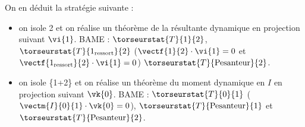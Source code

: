 On en déduit la stratégie suivante : 
\begin{itemize}
\item on isole 2 et on réalise un théorème de la résultante dynamique en projection suivant $\vi{1}$. BAME : 
$\torseurstat{T}{1}{2}$, $\torseurstat{T}{1_{\text{ressort}}}{2}$ ($\vectf{1}{2}\cdot \vi{1}= 0$ et 
$\vectf{1_{\text{ressort}}}{2}\cdot \vi{1}= 0$)
$\torseurstat{T}{\text{Pesanteur}}{2}$.
\item on isole \{1+2\} et on réalise un théorème du moment dynamique en $I$ en projection suivant $\vk{0}$. BAME : 
$\torseurstat{T}{0}{1}$ ($\vectm{I}{0}{1}\cdot \vk{0}= 0$), 
$\torseurstat{T}{\text{Pesanteur}}{1}$ et $\torseurstat{T}{\text{Pesanteur}}{2}$.

\end{itemize}
\else
\fi

\ifcolle
{}
\else
\fi

\ifprof
\else


\fi